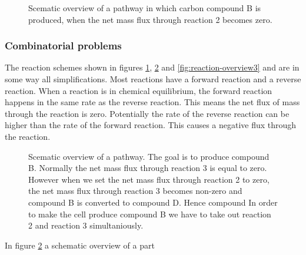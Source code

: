 \documentclass[12pt]{report}
\begin{document}
\begin{figure}[hbtp]
  \centering
     
      \caption{Scematic overview of a pathway in which carbon compound B is produced, when the net mass flux through reaction 2 becomes zero.}
  \label{fig:reaction-overview1}
\end{figure}

\subsubsection{Combinatorial problems}
The reaction schemes shown in figures \ref{fig:reaction-overview1}, \ref{fig:reaction-overview2} and \ref{fig:reaction-overview3} and are in some way all simplifications. Most reactions have a forward reaction and a reverse reaction. When a reaction is in chemical equilibrium, the forward reaction happens in the same rate as the reverse reaction. This means the net flux of mass through the reaction is zero. Potentially the rate of the reverse reaction can be higher than the rate of the forward reaction. This causes a negative flux through the reaction.

\begin{figure}[hbtp]
  \centering
     
      \caption{Scematic overview of a pathway. The goal is to produce compound B. Normally the net mass flux through reaction 3 is equal to zero. However when we set the net mass flux through reaction 2 to zero, the net mass flux through reaction 3 becomes non-zero and compound B is converted to compound D. Hence compound  In order to make the cell produce compound B we have to take out reaction 2 and reaction 3 simultaniously.}
  \label{fig:reaction-overview2}
\end{figure}

In figure \ref{fig:reaction-overview2} a schematic overview of a part 
\end{document}
